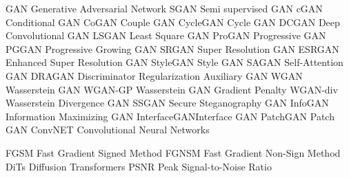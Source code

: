 




            {GAN}         {Generative Adversarial Network}
           {SGAN}        {Semi supervised GAN}
           {cGAN}        {Conditional GAN}
          {CoGAN}       {Couple GAN}
       {CycleGAN}    {Cycle GAN}
          {DCGAN}       {Deep Convolutional GAN}
          {LSGAN}       {Least Square GAN}
         {ProGAN}      {Progressive GAN}
          {PGGAN}       {Progressive Growing GAN}
          {SRGAN}       {Super Resolution GAN}
         {ESRGAN}      {Enhanced Super Resolution GAN}
       {StyleGAN}    {Style GAN}
          {SAGAN}       {Self-Attention GAN}
         {DRAGAN}      {Discriminator Regularization Auxiliary GAN}
           {WGAN}        {Wasserstein GAN}
        {WGAN-GP}     {Wasserstein GAN Gradient Penalty}
       {WGAN-div}    {Wasserstein Divergence GAN}
          {SSGAN}       {Secure Steganography GAN}
        {InfoGAN}     {Information Maximizing GAN}
   {InterfaceGAN}{Interface GAN}
       {PatchGAN}    {Patch GAN}
        {ConvNET}    {Convolutional Neural Networks}

           {FGSM}       {Fast Gradient Signed Method}
          {FGNSM}      {Fast Gradient Non-Sign Method}
           {DiTs}       {Diffusion Transformers}
           {PSNR}       {Peak Signal-to-Noise Ratio}










